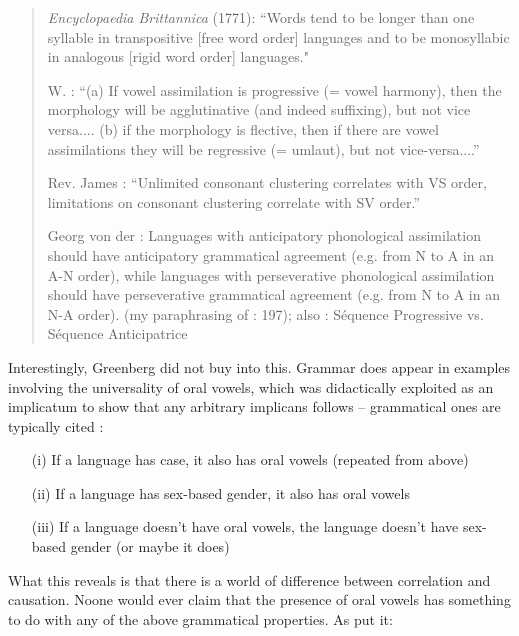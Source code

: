 \documentclass[output=paper]{langsci/langscibook}
\begin{document}
\begin{quote}
  \textit{Encyclopaedia Brittannica} (1771): “Words tend to be longer than one syllable in transpositive [free word order] languages and to be monosyllabic in analogous [rigid word order] languages." \citep[198]{Plank1998}
  
  W. \citet{Radioff1882}: “(a) If vowel assimilation is progressive (= vowel harmony), then the morphology will be agglutinative (and indeed suffixing), but not vice versa.... (b) if the morphology is flective, then if there are vowel assimilations they will be regressive (= umlaut), but not vice-versa....” \citep[202]{Plank1998}

  \newpage 
  Rev. James \citet{Byrne1885}: “Unlimited consonant clustering correlates with VS order, limitations on consonant clustering correlate with SV order.” \\
  \citep[200]{Plank1998}

  Georg von der \citet{Gabelentz1901}: Languages with anticipatory phonological assimilation should have anticipatory grammatical agreement (e.g. from N to A in an A-N order), while languages with perseverative phonological assimilation should have perseverative grammatical agreement (e.g. from N to A in an N-A order). (my paraphrasing of \citealt{Plank1998}: 197); also \citet{Bally1944}: Séquence Progressive vs. Séquence Anticipatrice \citep[211]{Plank1998}
\end{quote}


Interestingly, Greenberg did not buy into this. Grammar does appear in examples involving the universality of oral vowels, which was didactically exploited as an implicatum to show that any arbitrary implicans follows -- grammatical ones are typically cited \citep{Greenberg1966phonology,Greenberg1978b}:
\begin{itemize}
 \item[(i)]  If a language has case, it also has oral vowels (repeated from above)
 \item[(ii)]  If a language has sex-based gender, it also has oral vowels
 \item[(iii)]  If a language doesn’t have oral vowels, the language doesn’t have sex-based gender (or maybe it does)
\end{itemize}
  

 What this reveals is that there is a world of difference between correlation and causation. Noone would ever claim that the presence of oral vowels has something to do with any of the above grammatical properties. As \citet{Plank1998} put it:
\end{document}
